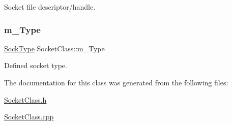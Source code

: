 Socket file descriptor/handle. 

\mbox{\label{classSocketClass_af838a669bfdae0c7b87be6504ec1b0dc}} 
\subsubsection{\texorpdfstring{m\+\_\+\+Type}{m\_Type}}
{\footnotesize\ttfamily \hyperlink{classSocketClass_a2182dd9fee09459fabb99e6ae717f595}{Sock\+Type} Socket\+Class\+::m\+\_\+\+Type\hspace{0.3cm}{\ttfamily [protected]}}



Defined socket type. 



The documentation for this class was generated from the following files\+:\begin{DoxyCompactItemize}
\item 
\hyperlink{SocketClass_8h}{Socket\+Class.\+h}\item 
\hyperlink{SocketClass_8cpp}{Socket\+Class.\+cpp}\end{DoxyCompactItemize}
